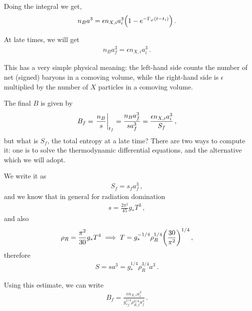 \documentclass[main.tex]{subfiles}
\begin{document}
Doing the integral we get, 
%
\begin{align}
n_B a^3 = \epsilon n_{X, i} a_i^3 \qty(1 - e^{- \Gamma _\varphi (t - t_i)})
\,.
\end{align}

At late times, we will get 
%
\begin{align}
n_B a_f^3 = \epsilon n_{X, i} a_i^3
\,.
\end{align}

This has a very simple physical meaning: the left-hand side counts the number of net (signed) baryons in a comoving volume, while the right-hand side is \(\epsilon \) multiplied by the number of \(X\) particles in a comoving volume. 

The final \(B\) is given by 
%
\begin{align}
B_f = \eval{\frac{n_B}{s}}_{t_f} = \frac{n_B a_f^3}{s a_f^3} = \frac{\epsilon n_{X, i} a_i^3}{S_f}
\,,
\end{align}
%
but what is \(S_f\), the total entropy at a late time?
There are two ways to compute it: one is to solve the thermodynamic differential equations, and the alternative which we will adopt.

We write it as 
%
\begin{align}
S_f =s_f a_f^3
\,,
\end{align}
%
and we know that in general for radiation domination 
%
\begin{align}
s = \frac{2 \pi^2}{45} g_* T^3
\,,
\end{align}
%
and also 
%
\begin{align}
\rho _R = \frac{\pi^2}{30} g_* T^{4} \implies T = g_*^{-1/4} \rho _R^{1/4} \qty(\frac{30}{\pi^2})^{1/4}
\,,
\end{align}
%
therefore 
%
\begin{align}
S = s a^3 = g_*^{1/4} \rho _R^{3/4} a^3
\,.
\end{align}

Using this estimate, we can write 
%
\begin{align}
B_f = \frac{\epsilon n_{X, i} a_i^3}{g_{*f}^{1/4} \rho _{R, f}^{3/4} a_f^3}
\,.
\end{align}
\end{document}
